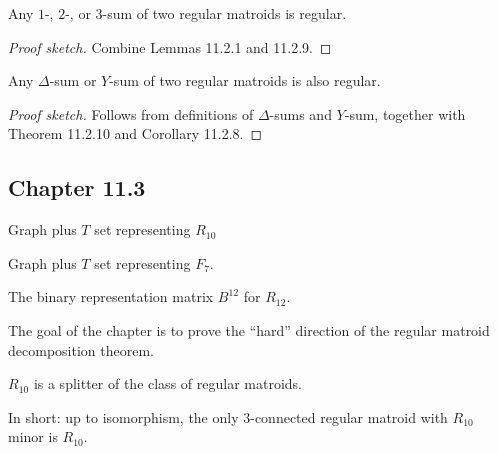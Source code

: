 \begin{theorem}[11.2.10]
  \label{thm:11.2.10}
  Any $1$-, $2$-, or $3$-sum of two regular matroids is regular.
\end{theorem}

\begin{proof}[Proof sketch]
  Combine Lemmas 11.2.1 and 11.2.9.
\end{proof}

\begin{corollary}[11.2.12]
  \label{cor:11.2.12}
  Any $\Delta$-sum or $Y$-sum of two regular matroids is also regular.
\end{corollary}

\begin{proof}[Proof sketch]
  Follows from definitions of $\Delta$-sums and $Y$-sum, together with Theorem 11.2.10 and Corollary 11.2.8.
\end{proof}


\subsection{Chapter 11.3}

\begin{proposition}[11.3.3]
  \label{prop:11.3.3}
  Graph plus $T$ set representing $R_{10}$
\end{proposition}

\begin{proposition}[11.3.5]
  \label{prop:11.3.5}
  Graph plus $T$ set representing $F_{7}$.
\end{proposition}

\begin{proposition}[11.3.11]
  \label{prop:11.3.11}
  The binary representation matrix $B^{12}$ for $R_{12}$.
\end{proposition}

The goal of the chapter is to prove the ``hard'' direction of the regular matroid decomposition theorem.

\begin{theorem}[11.3.2]
  \label{thm:11.3.2}
  $R_{10}$ is a splitter of the class of regular matroids.

  In short: up to isomorphism, the only $3$-connected regular matroid with $R_{10}$ minor is $R_{10}$.
\end{theorem}

